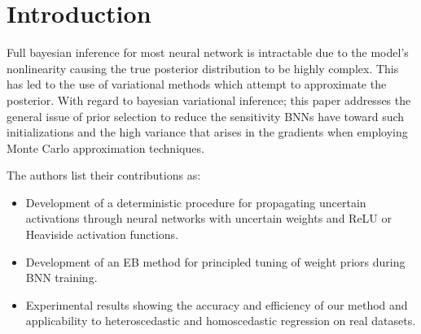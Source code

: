 \section{Introduction}
\label{sec:introduction}

Full bayesian inference for most neural network is intractable due to the model's nonlinearity causing the true posterior distribution to be highly complex. This has led to the use of variational methods which attempt to approximate the posterior. With regard to bayesian variational inference; this paper addresses the general issue of prior selection to reduce the sensitivity BNNs have toward such initializations and the high variance that arises in the gradients when employing Monte Carlo approximation techniques.

The authors list their contributions as:
\begin{itemize}
	\item Development of a deterministic procedure for propagating uncertain activations through neural networks with uncertain weights and ReLU or Heaviside activation functions.
	\item Development of an EB method for principled tuning of weight priors during BNN training.
	\item Experimental results showing the accuracy and efficiency of our method and applicability to heteroscedastic and homoscedastic regression on real datasets.
\end{itemize}    
 
